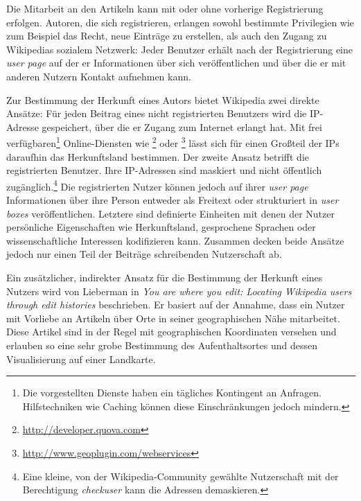 Die Mitarbeit an den Artikeln kann mit oder ohne vorherige Registrierung erfolgen.
Autoren, die sich registrieren, erlangen sowohl bestimmte Privilegien wie zum Beispiel das Recht, neue Einträge zu erstellen, als auch den Zugang zu Wikipedias sozialem Netzwerk:
Jeder Benutzer erhält nach der Registrierung eine \emph{user page} auf der er Informationen über sich veröffentlichen und über die er mit anderen Nutzern Kontakt aufnehmen kann.\cite{wikiwhyaccount}

Zur Bestimmung der Herkunft eines Autors bietet Wikipedia zwei direkte Ansätze: 
Für jeden Beitrag eines nicht registrierten Benutzers wird die IP-Adresse gespeichert, über die er Zugang zum Internet erlangt hat. 
Mit frei verfügbaren\footnote{Die vorgestellten Dienste haben ein tägliches Kontingent an Anfragen. Hilfstechniken wie Caching können diese Einschränkungen jedoch mindern.} Online-Diensten wie \footnote{\url{http://developer.quova.com}} oder \footnote{\url{http://www.geoplugin.com/webservices}} lässt sich für einen Großteil der IPs daraufhin das Herkunftsland bestimmen.
Der zweite Ansatz betrifft die registrierten Benutzer.
Ihre IP-Adressen sind maskiert und nicht öffentlich zugänglich.\footnote{Eine kleine, von der Wikipedia-Community gewählte Nutzerschaft mit der Berechtigung \emph{checkuser} kann die Adressen demaskieren.}
Die registrierten Nutzer können jedoch auf ihrer \emph{user page} Informationen über ihre Person entweder als Freitext oder strukturiert in \emph{user boxes} veröffentlichen.
Letztere sind definierte Einheiten mit denen der Nutzer persönliche Eigenschaften wie Herkunftsland, gesprochene Sprachen oder wissenschaftliche Interessen kodifizieren kann.
Zusammen decken beide Ansätze jedoch nur einen Teil der Beiträge schreibenden Nutzerschaft ab.

Ein zusätzlicher, indirekter Ansatz für die Bestimmung der Herkunft eines Nutzers wird von Lieberman in \emph{You are where you edit: Locating Wikipedia users through edit histories}\cite{lieberman2009you} beschrieben.
Er basiert auf der Annahme, dass ein Nutzer mit Vorliebe an Artikeln über Orte in seiner geographischen Nähe mitarbeitet. 
Diese Artikel sind in der Regel mit geographischen Koordinaten versehen und erlauben so eine sehr grobe Bestimmung des Aufenthaltsortes und dessen Visualisierung auf einer Landkarte.


